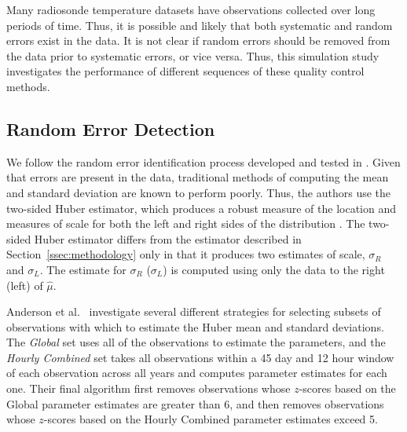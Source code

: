 \documentclass[12pt]{article}
\begin{document}
\begin{doublespacing}
Many radiosonde temperature datasets have observations collected over long periods of time.  Thus, it is possible and likely that both systematic and random errors exist in the data.  It is not clear if random errors should be removed from the data prior to systematic errors, or vice versa.  Thus, this simulation study investigates the performance of different sequences of these quality control methods.

\subsection{Random Error Detection}
\label{sec:ranErr}
We follow the random error identification process developed and tested in \cite{bell14}.  Given that errors are present in the data, traditional methods of computing the mean and standard deviation are known to perform poorly.  Thus, the authors use the two-sided Huber estimator, which produces a robust measure of the location and measures of scale for both the left and right sides of the distribution \cite{huber11}.  The two-sided Huber estimator differs from the estimator described in Section~\ref{ssec:methodology} only in that it produces two estimates of scale, $\sigma_R$ and $\sigma_L$.  The estimate for $\sigma_R$ ($\sigma_L$) is computed using only the data to the right (left) of $\hat{\mu}$.

Anderson et al.~\cite{bell14} investigate several different strategies for selecting subsets of observations with which to estimate the Huber mean and standard deviations.  The \emph{Global} set uses all of the observations to estimate the parameters, and the \emph{Hourly Combined} set takes all observations within  a 45 day and 12 hour window of each observation across all years and computes parameter estimates for each one.  Their final algorithm first removes observations whose $z$-scores based on the Global parameter estimates are greater than 6, and then removes observations whose $z$-scores  based on the Hourly Combined parameter estimates exceed 5.  



\end{doublespacing}
\end{document}
